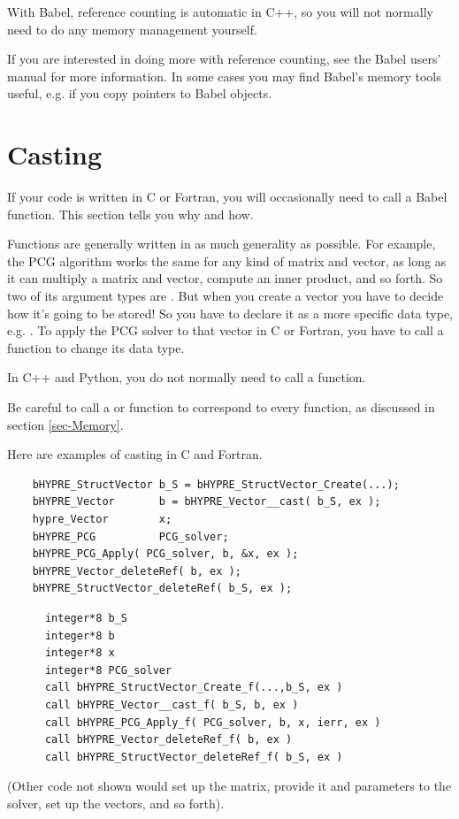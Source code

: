 With Babel, reference counting is automatic in C++, so you will not
normally need to do any memory management yourself.

If you are interested in doing more with reference counting, see the
Babel users' manual for more information.  In some cases you may find
Babel's memory tools useful, e.g. if you copy pointers to Babel
objects.


\section{Casting}
\label{sec-Casting}

If your code is written in C or Fortran, you will occasionally need to
call a Babel  function.  This section tells you why and
how.

Functions are generally written in as much generality as possible.
For example, the PCG algorithm works the same for any kind of matrix
and vector, as long as it can multiply a matrix and vector, compute an
inner product, and so forth.  So two of its argument types are
.  But when you create a vector you have to decide
how it's going to be stored!  So you have to declare it as a more
specific data type, e.g. .  To apply the PCG
solver to that vector in C or Fortran, you have to call a 
function to change its data type.

In C++ and Python, you do not normally need to call a 
function.

Be careful to call a  or  function to
correspond to every  function, as discussed in section
\ref{sec-Memory}.

Here are examples of casting in C and Fortran.
\begin{verbatim}
    bHYPRE_StructVector b_S = bHYPRE_StructVector_Create(...);
    bHYPRE_Vector       b = bHYPRE_Vector__cast( b_S, ex );
    hypre_Vector        x;
    bHYPRE_PCG          PCG_solver;
    bHYPRE_PCG_Apply( PCG_solver, b, &x, ex );
    bHYPRE_Vector_deleteRef( b, ex );
    bHYPRE_StructVector_deleteRef( b_S, ex );
\end{verbatim}
\begin{verbatim}
      integer*8 b_S
      integer*8 b
      integer*8 x
      integer*8 PCG_solver
      call bHYPRE_StructVector_Create_f(...,b_S, ex )
      call bHYPRE_Vector__cast_f( b_S, b, ex )
      call bHYPRE_PCG_Apply_f( PCG_solver, b, x, ierr, ex )
      call bHYPRE_Vector_deleteRef_f( b, ex )
      call bHYPRE_StructVector_deleteRef_f( b_S, ex )
\end{verbatim}
(Other code not shown would set up the matrix, provide it and
parameters to the solver, set up the vectors, and so forth).

